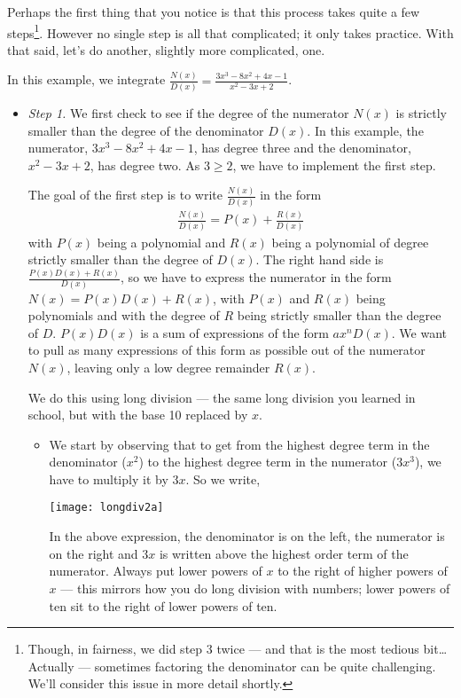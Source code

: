 Perhaps the first thing that you notice is that this process takes quite a few
steps\footnote{Though, in fairness, we did step 3 twice --- and that is the most
tedious bit\dots Actually --- sometimes factoring the denominator can be quite
challenging. We'll consider this issue in more detail shortly.}. However no single step
is all that complicated; it only takes practice. With that said, let's do another,
slightly more complicated, one.
\begin{eg}\label{eg:PFb}
In this example, we integrate $\frac{N(x)}{D(x)}
=\frac{3x^3-8x^2+4x-1}{x^2-3x+2}$.

\soln
\begin{itemize}
 \item \emph{Step 1.}
We first check to see if the degree of the numerator $N(x)$ is
strictly smaller than the degree of the denominator $D(x)$. In this
example, the numerator, $3x^3-8x^2+4x-1$, has degree three and the
denominator, $x^2-3x+2$, has degree two. As $3\ge 2$, we have to implement
the first step.

The goal of the first step is to write $\frac{N(x)}{D(x)}$
in the form
\begin{align*}
\frac{N(x)}{D(x)}=P(x)+\frac{R(x)}{D(x)}
\end{align*}
with $P(x)$ being a polynomial and $R(x)$ being a polynomial of degree
strictly smaller than the degree of $D(x)$. The right hand side is
$\frac{P(x)D(x)+R(x)}{D(x)}$, so we have to express the numerator
in the form $N(x)=P(x)D(x)+R(x)$, with $P(x)$ and $R(x)$ being polynomials
and with the degree of $R$ being strictly smaller than the degree of $D$.
$P(x)D(x)$ is a sum of expressions of the form $ax^n D(x)$. We want to
pull as many expressions of this form as possible out of the numerator
$N(x)$, leaving only a low degree remainder $R(x)$.

We do this using long division --- the same long division you learned in school, but with
the base 10 replaced by $x$.
\begin{itemize}
 \item We start by observing that to get from the highest degree
term in the denominator ($x^2$) to the highest degree term in the numerator ($3x^3$), we
have to multiply it by $3x$. So we write,
\begin{center}
\texttt{[image: longdiv2a]}
\end{center}
In the above expression, the denominator is on the left, the numerator is on the right
and $3x$ is written above the highest order term of the numerator. Always put lower
powers of $x$ to the right of higher powers of $x$ --- this mirrors how you do long
division with numbers; lower powers of ten sit to the right of lower powers of ten.


\end{itemize}
\end{itemize}
\end{eg}
